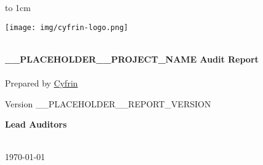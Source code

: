 \newlength{\logoWidth}
\setlength{\logoWidth}{0.5\textwidth}

\begin{titlepage}
  \normalsize %
  \vbox to 1cm{\vfill}

  \begin{center}    
    \texttt{[image: img/cyfrin-logo.png]} %
    
    \vspace{1cm}

    \noindent\makebox[\linewidth]{\rule{.75\paperwidth}{.6pt}}\\[0.7cm]

    {\huge \bfseries
      __PLACEHOLDER__PROJECT_NAME Audit Report
    }\\[0.25cm]
    
    \noindent\makebox[\linewidth]{\rule{.75\paperwidth}{.6pt}}\\[0.7cm]

    \large
    Prepared by \href{https://cyfrin.io}{Cyfrin}

    \large{
      Version __PLACEHOLDER__REPORT_VERSION
    }\\[1.2cm]
    
    \vfill

    \large
    {\bfseries Lead Auditors}\\

    \vspace{0.2cm}
    \\
    \vspace{1cm}




    \bigbreak
    \vfill
    
    {\normalsize \today}

  \end{center}

\end{titlepage}
